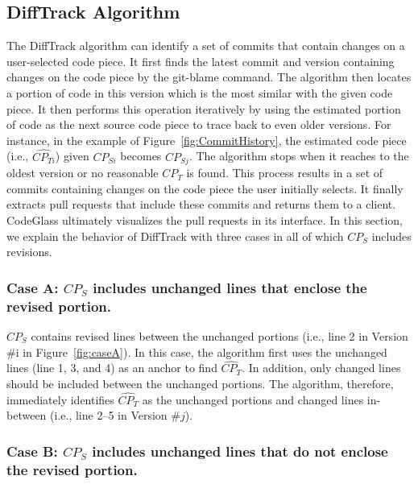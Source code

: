 \subsection{DiffTrack Algorithm}

The DiffTrack algorithm can identify a set of commits that contain changes on a user-selected code piece.
It first finds the latest commit and version containing changes on the code piece by the git-blame command.
The algorithm then locates a portion of code in this version which is the most similar with the given code piece.
It then performs this operation iteratively by using the estimated portion of code as the next source code piece to trace back to even older versions.
For instance, in the example of Figure~\ref{fig:CommitHistory}, the estimated code piece (i.e., $\widehat{CP_{Ti}}$) given $CP_{Si}$ becomes $CP_{Sj}$.
The algorithm stops when it reaches to the oldest version or no reasonable $\widehat{CP_{T}}$ is found.
This process results in a set of commits containing changes on the code piece the user initially selects.
It finally extracts pull requests that include these commits and returns them to a client.
CodeGlass ultimately visualizes the pull requests in its interface.
In this section, we explain the behavior of DiffTrack with three cases in all of which $CP_{S}$ includes revisions.


\subsubsection{Case A: $CP_S$ includes unchanged lines that enclose the revised portion.}


$CP_S$ contains revised lines between the unchanged portions (i.e., line 2 in Version \#i in Figure~\ref{fig:caseA}).
In this case, the algorithm first uses the unchanged lines (line 1, 3, and 4) as an anchor to find $\widehat{CP_T}$.
In addition, only changed lines should be included between the unchanged portions.
The algorithm, therefore, immediately identifies $\widehat{CP_T}$ as the unchanged portions and changed lines in-between (i.e., line 2--5 in Version \#$j$).

\subsubsection{Case B: $CP_S$ includes unchanged lines that do not enclose the revised portion.}

